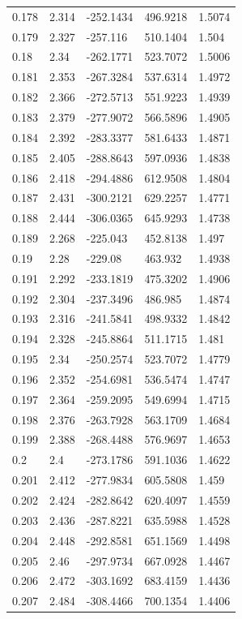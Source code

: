 \begin{tabular}{lllll}
0.178 & 2.314 & -252.1434 & 496.9218 & 1.5074 \\
0.179 & 2.327 & -257.116 & 510.1404 & 1.504 \\
0.18 & 2.34 & -262.1771 & 523.7072 & 1.5006 \\
0.181 & 2.353 & -267.3284 & 537.6314 & 1.4972 \\
0.182 & 2.366 & -272.5713 & 551.9223 & 1.4939 \\
0.183 & 2.379 & -277.9072 & 566.5896 & 1.4905 \\
0.184 & 2.392 & -283.3377 & 581.6433 & 1.4871 \\
0.185 & 2.405 & -288.8643 & 597.0936 & 1.4838 \\
0.186 & 2.418 & -294.4886 & 612.9508 & 1.4804 \\
0.187 & 2.431 & -300.2121 & 629.2257 & 1.4771 \\
0.188 & 2.444 & -306.0365 & 645.9293 & 1.4738 \\
0.189 & 2.268 & -225.043 & 452.8138 & 1.497 \\
0.19 & 2.28 & -229.08 & 463.932 & 1.4938 \\
0.191 & 2.292 & -233.1819 & 475.3202 & 1.4906 \\
0.192 & 2.304 & -237.3496 & 486.985 & 1.4874 \\
0.193 & 2.316 & -241.5841 & 498.9332 & 1.4842 \\
0.194 & 2.328 & -245.8864 & 511.1715 & 1.481 \\
0.195 & 2.34 & -250.2574 & 523.7072 & 1.4779 \\
0.196 & 2.352 & -254.6981 & 536.5474 & 1.4747 \\
0.197 & 2.364 & -259.2095 & 549.6994 & 1.4715 \\
0.198 & 2.376 & -263.7928 & 563.1709 & 1.4684 \\
0.199 & 2.388 & -268.4488 & 576.9697 & 1.4653 \\
0.2 & 2.4 & -273.1786 & 591.1036 & 1.4622 \\
0.201 & 2.412 & -277.9834 & 605.5808 & 1.459 \\
0.202 & 2.424 & -282.8642 & 620.4097 & 1.4559 \\
0.203 & 2.436 & -287.8221 & 635.5988 & 1.4528 \\
0.204 & 2.448 & -292.8581 & 651.1569 & 1.4498 \\
0.205 & 2.46 & -297.9734 & 667.0928 & 1.4467 \\
0.206 & 2.472 & -303.1692 & 683.4159 & 1.4436 \\
0.207 & 2.484 & -308.4466 & 700.1354 & 1.4406 \\

\end{tabular}

